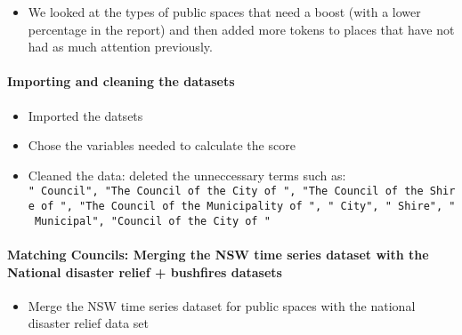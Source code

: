 \documentclass[
]{article}
\providecommand{\tightlist}{%
  \setlength{\itemsep}{0pt}\setlength{\parskip}{0pt}}
\begin{document}
\begin{itemize}
\tightlist
\item
  We looked at the types of public spaces that need a boost (with a
  lower percentage in the report) and then added more tokens to places
  that have not had as much attention previously.
\end{itemize}

\hypertarget{importing-and-cleaning-the-datasets}{%
\paragraph{Importing and cleaning the
datasets}\label{importing-and-cleaning-the-datasets}}

\begin{itemize}
\tightlist
\item
  Imported the datsets
\item
  Chose the variables needed to calculate the score
\item
  Cleaned the data: deleted the unneccessary terms such as:
  \texttt{"\ Council",\ "The\ Council\ of\ the\ City\ of\ ",\ "The\ Council\ of\ the\ Shire\ of\ ",\ "The\ Council\ of\ the\ Municipality\ of\ ",\ "\ City",\ "\ Shire",\ "\ Municipal",\ "Council\ of\ the\ City\ of\ "}
\end{itemize}

\hypertarget{matching-councils-merging-the-nsw-time-series-dataset-with-the-national-disaster-relief-bushfires-datasets}{%
\paragraph{Matching Councils: Merging the NSW time series dataset with
the National disaster relief + bushfires
datasets}\label{matching-councils-merging-the-nsw-time-series-dataset-with-the-national-disaster-relief-bushfires-datasets}}

\begin{itemize}
\tightlist
\item
  Merge the NSW time series dataset for public spaces with the national
  disaster relief data set
\end{itemize}
\end{document}
